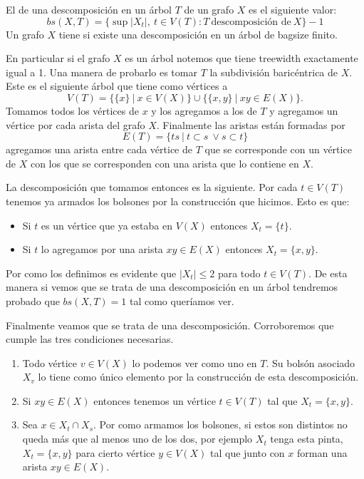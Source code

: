 \documentclass[tesis.tex]{subfiles}
\begin{document}
\begin{deff}
El  de una descomposición en un árbol $T$ de un grafo $X$ es el siguiente valor:
	\begin{equation*}
		bs(X,T) = \{ \sup |X_t|, \ t \in V(T) : T \ \text{descomposición de} \ X  \} - 1
	\end{equation*}
Un grafo $X$ tiene  si existe una descomposición en un árbol de bagsize finito.	
\end{deff}
\begin{obs}\label{desc-arbol-arbol}
 En particular si el grafo $X$ es un árbol notemos que tiene treewidth exactamente igual a 1.
 Una manera de probarlo es tomar $T$ la subdivisión baricéntrica de $X$. 
 Este es el siguiente árbol que tiene como vértices a 
 \[
 V(T) = \{ \{ x \} \ | \ x \in V(X)  \} \cup \{ \{ x,y \} \ | \ xy \in E(X) \}.
 \]
 Tomamos todos los vértices de $x$ y los agregamos a los de $T$ y agregamos un vértice por cada arista del grafo $X$.
 Finalmente las aristas están formadas por 
 \[
 E(T) = \{  ts \ | \ t \subset s \ \lor s \subset t \}
 \]
 agregamos una arista entre cada vértice de $T$ que se corresponde con un vértice de $X$ con los que se corresponden con una arista que lo contiene en $X$. 
 
 
 La descomposición que tomamos entonces es la siguiente. 
 Por cada $t \in V(T)$ tenemos ya armados los bolsones por la construcción que hicimos. 
 Esto es que:
 \begin{itemize}
 	\item Si $t$ es un vértice que ya estaba en $V(X)$ entonces $X_t = \{ t \}$. 
 	\item Si $t$ lo agregamos por una arista $xy \in E(X)$ entonces $X_t = \{ x,y  \}$.
 \end{itemize}
Por como los definimos es evidente que $|X_t| \le 2$ para todo $t \in V(T)$.
De esta manera si vemos que se trata de una descomposición en un árbol tendremos probado que $bs(X,T) = 1$ tal como queríamos ver.

Finalmente veamos que se trata de una descomposición. Corroboremos que cumple las tres condiciones necesarias.
\begin{enumerate}
	\item Todo vértice $v \in V(X)$ lo podemos ver como uno en $T$. Su bolsón asociado $X_v$ lo tiene como único elemento por la construcción de esta descomposición.
	\item Si $xy \in E(X)$ entonces tenemos un vértice $t\in V(T)$ tal que $X_{t} = \{ x,y \}$. 
	\item Sea $x \in X_t \cap X_s$. 
	Por como armamos los bolsones, si estos son distintos no queda más que al menos uno de los dos, por ejemplo $X_t$ tenga esta pinta, $X_t = \{ x,y\}$ para cierto vértice $y \in V(X)$ tal que junto con $x$ forman una arista $xy \in E(X)$.
	

\end{enumerate}
\end{obs}
\end{document}
